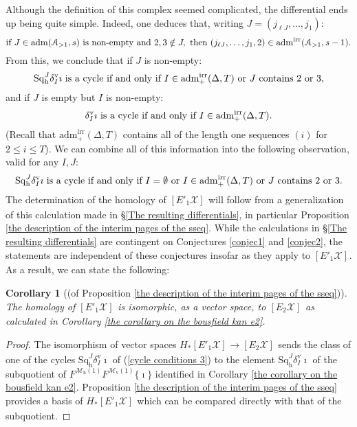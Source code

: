 \documentclass[11pt]{amsart} \renewcommand{\baselinestretch}{1.2}
\theoremstyle{plain}
\newtheorem{cor}[thm]{Corollary}
\numberwithin{equation}{section} %
\theoremstyle{plain}
\newtheorem{cor}[thm]{Corollary}
\numberwithin{equation}{chapter} %
\renewcommand{\to}{\longrightarrow}
\newcommand{\calA}{\mathcal{A}}
\newcommand{\calx}{\mathcal{X}}
\newcommand{\calMv}{\mathcal{M}\dver}
\newcommand{\calMh}{\mathcal{M}\dhor}
\newcommand{\LieSteen}{\calA}
\newcommand{\aS}[1]{\mathrm{adm}(\LieSteen_{>1},#1)}
\newcommand{\aSirr}[1]{\mathrm{adm}^\mathrm{irr}(\LieSteen_{>1},#1)}
\newcommand{\aDTirr}{\mathrm{adm}_+^\mathrm{irr}(\Delta,T)}
\newcommand{\Eprime}[5]{[E'_{#2}#3]^{#4}_{#5}}
\newcommand{\E}[5]{[E^{#1}_{#2}#3]^{#4}_{#5}}
\newcommand{\uver}{^\mathrm{v}}
\newcommand{\dver}{_\mathrm{v}}
\newcommand{\dhor}{_\mathrm{h}}
\newcommand{\Sqh}{\mathrm{Sq}\dhor}
\newcommand{\deltav}{\delta\uver}
\begin{document}
\begin{Calculations of HWn}
Although the definition of this complex seemed complicated, the differential ends up being quite simple. Indeed, one deduces that, writing $J=(j_{\ell J},\ldots,j_1)$:
\[
\textup{if }J\in\aS{s}\textup{ is non-empty and } 2,3\notin J,\textup{ then }(j_{\ell J},\ldots,j_1,2)\in\aSirr{s-1}.
\]
From this, we conclude that if $J$ is non-empty:
\begin{equation}
\label{cycle conditions 1}
\textup{$\Sqh^J\deltav_I\imath$ is a cycle if and only if $I \in \aDTirr$ or $J$ contains 2 or 3},
\end{equation}
and if $J$ is empty but $I$ is non-empty:
\begin{equation}
\label{cycle conditions 2}
\textup{$\deltav_I\imath$ is a cycle if and only if $I \in \aDTirr$}.\end{equation}
(Recall that $\aDTirr$ contains all of the length one sequences $(i)$ for $2\leq i \leq T$). We can combine all of this information into the following observation, valid for any $I,J$:
\begin{equation}
\label{cycle conditions 3}
\textup{$\Sqh^J\deltav_I\imath$ is a cycle if and only if $I=\emptyset$ or $I \in \aDTirr$ or $J$ contains 2 or 3}.
\end{equation}
The determination of the  homology of $\Eprime{blank}{1}{\calx}{}{}$ will follow from a generalization of this calculation made in \S\ref{The resulting differentials}, in particular Proposition \ref{the description of the interim pages of the sseq}. While the calculations in \S\ref{The resulting differentials} are contingent on Conjectures \ref{conjec1} and \ref{conjec2}, the statements are independent of these conjectures insofar as they apply to $\Eprime{blank}{1}{\calx}{}{}$. As a result, we can state the following:
\begin{cor}[(of Proposition \ref{the description of the interim pages of the sseq})]
The homology of $\Eprime{blank}{1}{\calx}{}{}$ is isomorphic, as a vector space, to $\E{}{2}{\calx}{}{}$ as calculated in Corollary \ref{the corollary on the bousfield kan e2}.
\end{cor}
\begin{proof}
The isomorphism of vector spaces $H_*\Eprime{blank}{1}{\calx}{}{}\to \E{}{2}{\calx}{}{}$ sends the class of one of the cycles $\Sqh^J\deltav_I\imath$ of (\ref{cycle conditions 3}) to the element $\Sqh^J\deltav_I\imath$ of the subquotient of $F^{\calMh(1)}F^{\calMv(1)}\{\imath\}$ identified  in Corollary \ref{the corollary on the bousfield kan e2}. Proposition \ref{the description of the interim pages of the sseq} provides a basis of $H_*\Eprime{blank}{1}{\calx}{}{}$ which can be compared directly with that of the subquotient.
\end{proof}

\end{Calculations of HWn}
\end{document}
